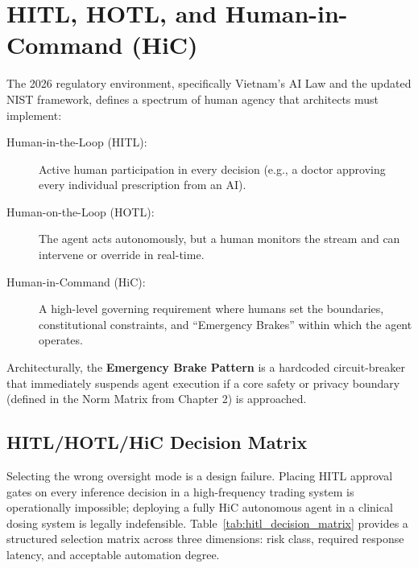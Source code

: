 \section{HITL, HOTL, and Human-in-Command (HiC)}
\label{sec:agency_spectrum}

The 2026 regulatory environment, specifically Vietnam's AI Law and the updated NIST framework, defines a spectrum of human agency that architects must implement:

\begin{description}
  \item[Human-in-the-Loop (HITL):] Active human participation in every decision (e.g., a doctor approving every individual prescription from an AI).
  \item[Human-on-the-Loop (HOTL):] The agent acts autonomously, but a human monitors the stream and can intervene or override in real-time.
  \item[Human-in-Command (HiC):] A high-level governing requirement where humans set the boundaries, constitutional constraints, and ``Emergency Brakes'' within which the agent operates.
\end{description}

Architecturally, the \textbf{Emergency Brake Pattern} is a hardcoded circuit-breaker that immediately suspends agent execution if a core safety or privacy boundary (defined in the Norm Matrix from Chapter 2) is approached.

\subsection{HITL/HOTL/HiC Decision Matrix}
\label{subsec:hitl_decision_matrix}

Selecting the wrong oversight mode is a design failure. Placing HITL approval gates on every inference decision in a high-frequency trading system is operationally impossible; deploying a fully HiC autonomous agent in a clinical dosing system is legally indefensible. Table~\ref{tab:hitl_decision_matrix} provides a structured selection matrix across three dimensions: risk class, required response latency, and acceptable automation degree.

